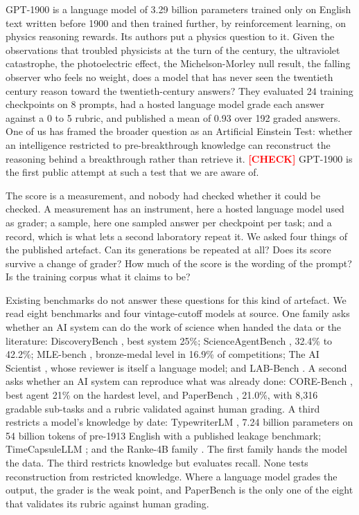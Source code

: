 \documentclass[reprint,prx,amsmath,amssymb,aps,superscriptaddress]{revtex4-2}
\begin{document}
GPT-1900 \cite{ref1} is a language model of 3.29 billion parameters trained only on English text written before 1900 and then trained further, by reinforcement learning, on physics reasoning rewards. Its authors put a physics question to it. Given the observations that troubled physicists at the turn of the century, the ultraviolet catastrophe, the photoelectric effect, the Michelson-Morley null result, the falling observer who feels no weight, does a model that has never seen the twentieth century reason toward the twentieth-century answers? They evaluated 24 training checkpoints on 8 prompts, had a hosted language model grade each answer against a 0 to 5 rubric, and published a mean of 0.93 over 192 graded answers. One of us has framed the broader question as an Artificial Einstein Test: whether an intelligence restricted to pre-breakthrough knowledge can reconstruct the reasoning behind a breakthrough rather than retrieve it. \textbf{\textcolor{red}{[CHECK]}} GPT-1900 is the first public attempt at such a test that we are aware of.

The score is a measurement, and nobody had checked whether it could be checked. A measurement has an instrument, here a hosted language model used as grader; a sample, here one sampled answer per checkpoint per task; and a record, which is what lets a second laboratory repeat it. We asked four things of the published artefact. Can its generations be repeated at all? Does its score survive a change of grader? How much of the score is the wording of the prompt? Is the training corpus what it claims to be?

Existing benchmarks do not answer these questions for this kind of artefact. We read eight benchmarks and four vintage-cutoff models at source. One family asks whether an AI system can do the work of science when handed the data or the literature: DiscoveryBench \cite{ref3}, best system 25\%; ScienceAgentBench \cite{ref4}, 32.4\% to 42.2\%; MLE-bench \cite{ref5}, bronze-medal level in 16.9\% of competitions; The AI Scientist \cite{ref6}, whose reviewer is itself a language model; and LAB-Bench \cite{ref7}. A second asks whether an AI system can reproduce what was already done: CORE-Bench \cite{ref8}, best agent 21\% on the hardest level, and PaperBench \cite{ref9}, 21.0\%, with 8,316 gradable sub-tasks and a rubric validated against human grading. A third restricts a model's knowledge by date: TypewriterLM \cite{ref10}, 7.24 billion parameters on 54 billion tokens of pre-1913 English with a published leakage benchmark; TimeCapsuleLLM \cite{ref11}; and the Ranke-4B family \cite{ref12}. The first family hands the model the data. The third restricts knowledge but evaluates recall. None tests reconstruction from restricted knowledge. Where a language model grades the output, the grader is the weak point, and PaperBench is the only one of the eight that validates its rubric against human grading.
\end{document}

